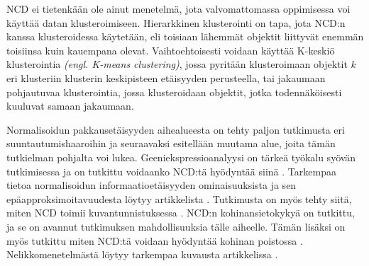\documentclass[12pt,finnish,final]{tktltiki2}
\theoremstyle{definition}
\theoremstyle{remark}
\newcommand{\engl}[1]{\emph{(engl. #1)}}
\begin{document}
  NCD ei tietenkään ole ainut menetelmä, jota valvomattomassa oppimisessa voi käyttää datan klusteroimiseen.
  Hierarkkinen klusterointi on tapa, jota NCD:n kanssa klusteroidessa käytetään, eli toisiaan lähemmät objektit liittyvät enemmän toisiinsa kuin kauempana olevat.
  Vaihtoehtoisesti voidaan käyttää K-keskiö klusterointia \engl{K-means clustering}, jossa pyritään klusteroimaan objektit $k$ eri klusteriin klusterin keskipisteen etäisyyden perusteella, tai jakaumaan pohjautuvaa klusterointia, jossa klusteroidaan objektit, jotka todennäköisesti kuuluvat samaan jakaumaan.

  Normalisoidun pakkausetäisyyden aihealueesta on tehty paljon tutkimusta eri suuntautumishaaroihin ja seuraavaksi esitellään muutama alue, joita tämän tutkielman pohjalta voi lukea.
  Geeniekspressioanalyysi on tärkeä työkalu syövän tutkimisessa ja on tutkittu voidaanko NCD:tä hyödyntää siinä \cite{nykter2005normalized}.
  Tarkempaa tietoa normalisoidun informaatioetäisyyden ominaisuuksista ja sen epäapproksimoitavuudesta löytyy artikkelista \cite{terwijn2011nonapproximability}.
  Tutkimusta on myös tehty siitä, miten NCD toimii kuvantunnistuksessa \cite{doi:10.1117/12.704334}.
  NCD:n kohinansietokykyä on tutkittu, ja se on avannut tutkimuksen mahdollisuuksia tälle aiheelle. Tämän lisäksi on myös tutkittu miten NCD:tä voidaan hyödyntää kohinan poistossa \cite{vitanyi2013similarity}.
  Nelikkomenetelmästä löytyy tarkempaa kuvausta artikkelissa \cite{cilibrasi2011fast}.


%
%

%

% 





%
\end{document}
